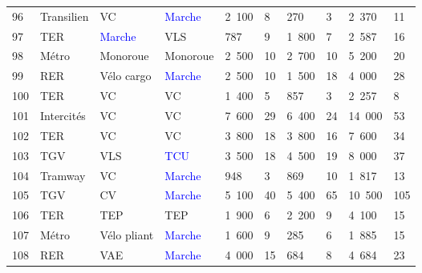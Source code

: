 \begin{longtable}{p{0.7cm}p{1.4cm}p{1.4cm}p{1.6cm}p{0.8cm}p{0.8cm}p{0.8cm}p{0.8cm}p{1.1cm}p{1.1cm}}
    \small{96} & \small{Transilien} & \small{VC} & \small{\textcolor{blue}{Marche}} & \small{2~100} & \small{8} & \small{270} & \small{3} & \small{2~370} & \small{11}\\
    \small{97} & \small{TER} & \small{\textcolor{blue}{Marche}} & \small{VLS} & \small{787} & \small{9} & \small{1~800} & \small{7} & \small{2~587} & \small{16}\\
    \small{98} & \small{Métro} & \small{Monoroue} & \small{Monoroue} & \small{2~500} & \small{10} & \small{2~700} & \small{10} & \small{5~200} & \small{20}\\
    \small{99} & \small{RER} & \small{Vélo cargo} & \small{\textcolor{blue}{Marche}} & \small{2~500} & \small{10} & \small{1~500} & \small{18} & \small{4~000} & \small{28}\\
    \small{100} & \small{TER} & \small{VC} & \small{VC} & \small{1~400} & \small{5} & \small{857} & \small{3} & \small{2~257} & \small{8}\\
    \small{101} & \small{Intercités} & \small{VC} & \small{VC} & \small{7~600} & \small{29} & \small{6~400} & \small{24} & \small{14~000} & \small{53}\\
    \small{102} & \small{TER} & \small{VC} & \small{VC} & \small{3~800} & \small{18} & \small{3~800} & \small{16} & \small{7~600} & \small{34}\\
    \small{103} & \small{TGV} & \small{VLS} & \small{\textcolor{blue}{TCU}} & \small{3~500} & \small{18} & \small{4~500} & \small{19} & \small{8~000} & \small{37}\\
    \small{104} & \small{Tramway} & \small{VC} & \small{\textcolor{blue}{Marche}} & \small{948} & \small{3} & \small{869} & \small{10} & \small{1~817} & \small{13}\\
    \small{105} & \small{TGV} & \small{CV} & \small{\textcolor{blue}{Marche}} & \small{5~100} & \small{40} & \small{5~400} & \small{65} & \small{10~500} & \small{105}\\
    \small{106} & \small{TER} & \small{TEP} & \small{TEP} & \small{1~900} & \small{6} & \small{2~200} & \small{9} & \small{4~100} & \small{15}\\
    \small{107} & \small{Métro} & \small{Vélo pliant} & \small{\textcolor{blue}{Marche}} & \small{1~600} & \small{9} & \small{285} & \small{6} & \small{1~885} & \small{15}\\
    \small{108} & \small{RER} & \small{VAE} & \small{\textcolor{blue}{Marche}} & \small{4~000} & \small{15} & \small{684} & \small{8} & \small{4~684} & \small{23}\\

\end{longtable}

